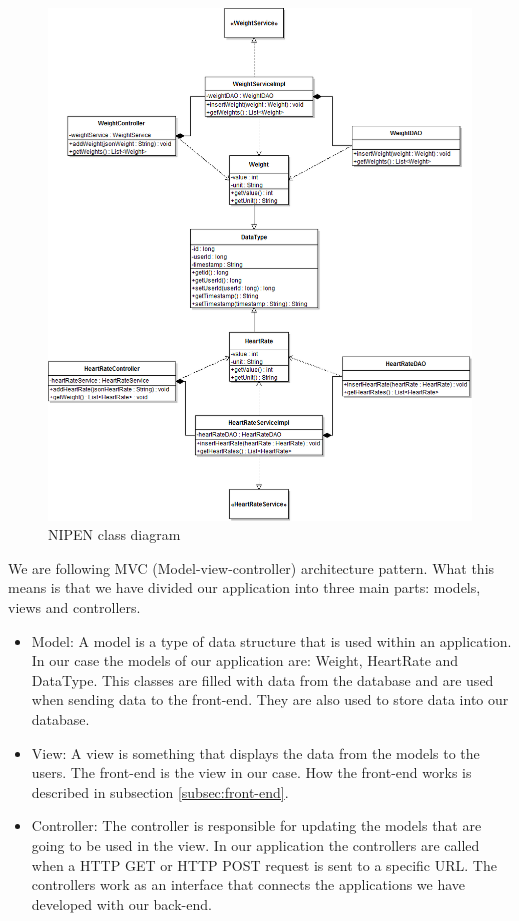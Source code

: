 \begin{figure}[h]
\centering
\includegraphics[scale=0.5]{../Figures/NIPEN-class-diagram.png}
\caption{NIPEN class diagram}
\label{figure:nipen-class-diagram}
\end{figure}

We are following MVC (Model-view-controller) architecture pattern. 
What this means is that we have divided our application into three main parts: models, views and controllers.

\begin{itemize}

\item Model: A model is a type of data structure that is used within an application.
In our case the models of our application are: Weight, HeartRate and DataType.
This classes are filled with data from the database and are used when sending data to the front-end.
They are also used to store data into our database.

\item View: A view is something that displays the data from the models to the users.
The front-end is the view in our case.
How the front-end works is described in subsection \ref{subsec:front-end}.

\item Controller: The controller is responsible for updating the models that are going to be used in the view.
In our application the controllers are called when a HTTP GET or HTTP POST request is sent to a specific URL.
The controllers work as an interface that connects the applications we have developed with our back-end.

\end{itemize}

